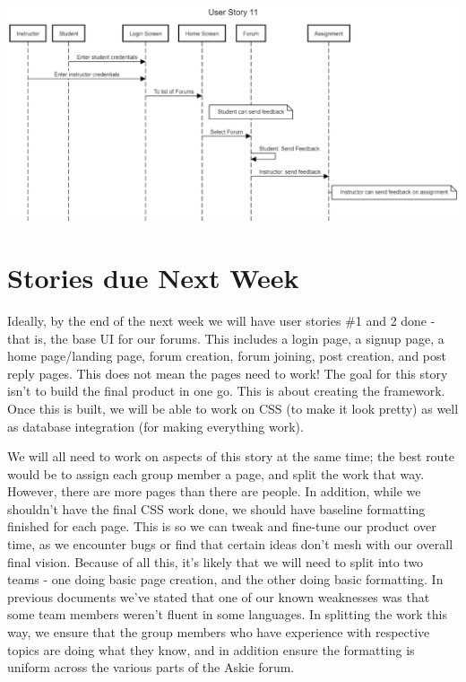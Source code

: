 \documentclass[12pt]{article}
\begin{document}
\begin{flushleft}
\includegraphics[width=\textwidth]{User_Story_11.eps}
\end{flushleft}


\section{Stories due Next Week}
\begin{flushleft}
Ideally, by the end of the next week we will have user stories \#1 and 2 done - that is, the base UI for our forums. This includes a login page, a signup page, a home page/landing page, forum creation, forum joining, post creation, and post reply pages. This does not mean the pages need to work! The goal for this story isn't to build the final product in one go. This is about creating the framework. Once this is built, we will be able to work on CSS (to make it look pretty) as well as database integration (for making everything work). 
\end{flushleft}
\begin{flushleft}
We will all need to work on aspects of this story at the same time; the best route would be to assign each group member a page, and split the work that way. However, there are more pages than there are people. In addition, while we shouldn't have the final CSS work done, we should have baseline formatting finished for each page. This is so we can tweak and fine-tune our product over time, as we encounter bugs or find that certain ideas don't mesh with our overall final vision. Because of all this, it's likely that we will need to split into two teams - one doing basic page creation, and the other doing basic formatting. In previous documents we've stated that one of our known weaknesses was that some team members weren't fluent in some languages. In splitting the work this way, we ensure that the group members who have experience with respective topics are doing what they know, and in addition ensure the formatting is uniform across the various parts of the Askie forum.
\end{flushleft}
\end{document}
